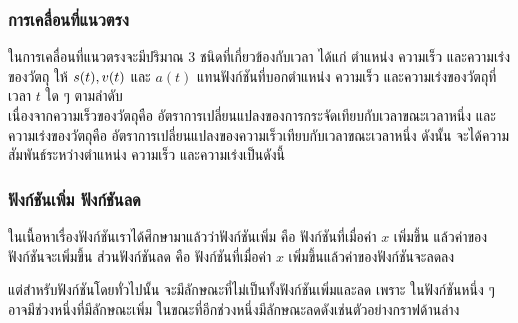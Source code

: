\documentclass[hidelinks,12pt,a4paper]{article}
\newcommand{\s}{\space}
\begin{document}
\subsubsection{การเคลื่อนที่แนวตรง}
ในการเคลื่อนที่แนวตรงจะมีปริมาณ 3 ชนิดที่เกี่ยวข้องกับเวลา ได้แก่ ตำแหน่ง ความเร็ว และความเร่งของวัตถุ ให้ $s(t),\s v(t)$ และ $a(t)$ แทนฟังก์ชันที่บอกตำแหน่ง ความเร็ว และความเร่งของวัตถุที่เวลา $t$ ใด ๆ ตามลำดับ\\
เนื่องจากความเร็วของวัตถุคือ อัตราการเปลี่ยนแปลงของการกระจัดเทียบกับเวลาขณะเวลาหนึ่ง และ ความเร่งของวัตถุคือ อัตราการเปลี่ยนแปลงของความเร็วเทียบกับเวลาขณะเวลาหนึ่ง ดังนั้น จะได้ความสัมพันธ์ระหว่างตำแหน่ง ความเร็ว และความเร่งเป็นดังนี้
\begin{center}
\begin{tcolorbox}[width=10cm,colback=red!10,colframe=red!90!blue]
\end{tcolorbox}
\end{center}
\subsubsection{ฟังก์ชันเพิ่ม ฟังก์ชันลด}
ในเนื้อหาเรื่องฟังก์ชันเราได้ศึกษามาแล้วว่าฟังก์ชันเพิ่ม คือ ฟังก์ชันที่เมื่อค่า $x$ เพิ่มขึ้น แล้วค่าของฟังก์ชันจะเพิ่มขึ้น ส่วนฟังก์ชันลด คือ ฟังก์ชันที่เมื่อค่า $x$ เพิ่มขึ้นแล้วค่าของฟังก์ชันจะลดลง

แต่สำหรับฟังก์ชันโดยทั่วไปนั้น จะมีลักษณะที่ไม่เป็นทั้งฟังก์ชันเพิ่มและลด เพราะ ในฟังก์ชันหนึ่ง ๆ อาจมีช่วงหนึ่งที่มีลักษณะเพิ่ม ในขณะที่อีกช่วงหนึ่งมีลักษณะลดดังเช่นตัวอย่างกราฟด้านล่าง
\end{document}
